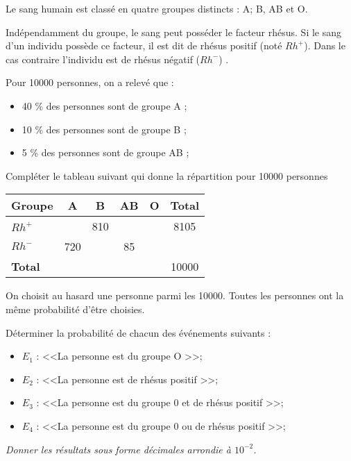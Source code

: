 
Le sang humain est classé en quatre groupes distincts : A; B, AB et O.

Indépendamment du groupe, le sang peut posséder le facteur rhésus. Si le sang d'un individu possède ce facteur, il est dit de rhésus positif (noté $Rh^+$). Dans le cas contraire l'individu est de rhésus négatif ($Rh^-$) .

Pour \num{10000} personnes, on a relevé que :

\begin{itemize}
	\item 40 \% des personnes sont de groupe A ;
	\item 10 \% des personnes sont de groupe B ;
	\item 5 \% des personnes sont de groupe AB ;
\end{itemize}

\begin{questions}
	
	\question[5] Compléter le tableau suivant qui donne la répartition pour \num{10000} personnes
	
	\begin{center}
		\begin{tabular}{|@{\ }l@{\ }|c|c|c|c|@{\ }@{\ }c@{\ }@{\ }|}
			\hline
			\textbf{Groupe} & \textbf{A}   & \textbf{B}   & \textbf{AB} & \textbf{O}        & \textbf{Total}       \\ \hline
			\textbf{$Rh^+$} &     & 810 &    &  & \num{8105}  \\ \hline
			\textbf{$Rh^-$} & 720 &     & 85 &          &             \\ \hline
			\textbf{Total}  &     &     &    &          & \num{10000} \\ \hline
		\end{tabular}
		
	\end{center}
	
	
	\question[5]
	
	On choisit au hasard une personne parmi les \num{10000}. Toutes les personnes ont la même probabilité d'être choisies.
	
	Déterminer la probabilité de chacun des événements suivants :
	
	\begin{itemize}
		\item $E_1$ : <<La personne est du groupe O >>;
		\item $E_2$ : <<La personne est de rhésus positif >>;
		\item $E_3$ : <<La personne est du groupe 0 et de rhésus positif >>;
		\item $E_4$ : <<La personne est du groupe 0 ou de rhésus positif >>;
	\end{itemize}
	\textit{Donner les résultats sous forme décimales arrondie à $10^{-2}$. }
	
	
	\fillwithdottedlines{9cm}
\end{questions}